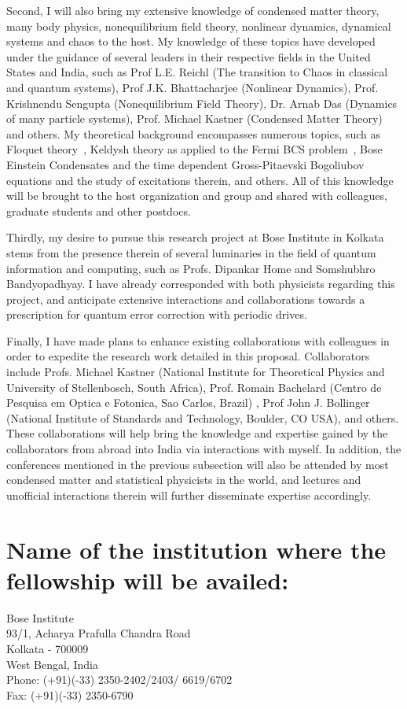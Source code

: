 \documentclass[a4paper,11pt,color]{article}
\begin{document}
Second, I will also bring my extensive knowledge of condensed matter theory, many body physics, nonequilibrium field theory, nonlinear dynamics, dynamical systems and chaos to the host. My knowledge of these topics have developed under the guidance of several leaders in their respective fields in the United States and India, such as Prof L.E. Reichl (The transition to Chaos in classical and quantum systems), Prof J.K. Bhattacharjee (Nonlinear Dynamics), Prof. Krishnendu Sengupta (Nonequilibrium Field Theory), Dr. Arnab Das (Dynamics of many particle systems), Prof. Michael Kastner (Condensed Matter Theory) and others. My theoretical background encompasses numerous topics, such as  Floquet theory~\cite{floquet}, Keldysh theory as applied to the Fermi BCS problem~\cite{bcs}, Bose Einstein Condensates and the time dependent Gross-Pitaevski Bogoliubov equations and the study of excitations therein, and others. All of this knowledge will be brought to the host organization and group and shared with colleagues, graduate students and other postdocs.

Thirdly, my desire to pursue this research project at Bose Institute in Kolkata stems from the presence therein of several luminaries in the field of quantum information and computing, such as Profs. Dipankar Home and Somshubhro Bandyopadhyay. I have already corresponded with both physicists regarding this project, and anticipate extensive interactions and collaborations towards a prescription for quantum error correction with periodic drives.

Finally, I have made plans to enhance existing collaborations with colleagues in order to expedite the research work detailed in this proposal. Collaborators include  Profs. Michael Kastner  (National Institute for Theoretical Physics and University of Stellenbosch, South Africa), Prof. Romain Bachelard (Centro de Pesquisa em Optica e Fotonica, Sao Carlos, Brazil)  , Prof  John J. Bollinger (National Institute of Standards and Technology, Boulder, CO USA), and others. These collaborations will help bring the knowledge and expertise gained by the collaborators from abroad into India via interactions with myself. In addition, the conferences  mentioned in the previous subsection will also be attended by most condensed matter and statistical physicists in the world, and lectures and unofficial interactions therein will further disseminate expertise accordingly.

\section{\sc Name of the institution where the fellowship will be availed:}
Bose Institute\\
93/1, Acharya Prafulla Chandra Road\\
Kolkata - 700009\\
West Bengal, India\\ 
Phone: (+91)(-33) 2350-2402/2403/ 6619/6702\\
Fax: (+91)(-33) 2350-6790
\end{document}

